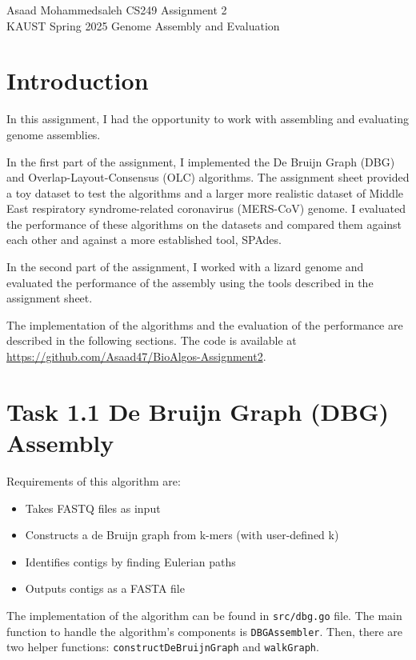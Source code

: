 \documentclass[12pt]{article}
\begin{document}
\noindent Asaad Mohammedsaleh \hfill CS249 Assignment 2\\
KAUST Spring 2025 \hfill Genome Assembly and Evaluation


\hrulefill

\section{Introduction}

In this assignment, I had the opportunity to work with assembling and evaluating genome assemblies. 

In the first part of the assignment, I implemented the De Bruijn Graph (DBG) and Overlap-Layout-Consensus (OLC) algorithms.
The assignment sheet provided a toy dataset to test the algorithms and a larger more realistic dataset of Middle East respiratory
syndrome-related coronavirus (MERS-CoV) genome. I evaluated the performance of these algorithms on the datasets and compared them against each other and against a more established tool, SPAdes.

In the second part of the assignment, I worked with a lizard genome and evaluated the performance of the assembly using the tools described in the assignment sheet. 

The implementation of the algorithms and the evaluation of the performance are described in the following sections. The code is available at \url{https://github.com/Asaad47/BioAlgos-Assignment2}.

\section{Task 1.1 De Bruijn Graph (DBG) Assembly}

Requirements of this algorithm are:
\begin{itemize}
    \item Takes FASTQ files as input
    \item Constructs a de Bruijn graph from k-mers (with user-defined k)
    \item Identifies contigs by finding Eulerian paths
    \item Outputs contigs as a FASTA file
\end{itemize}

The implementation of the algorithm can be found in \texttt{src/dbg.go} file. The main function to handle the algorithm's components is \texttt{DBGAssembler}.
Then, there are two helper functions: \texttt{constructDeBruijnGraph} and \texttt{walkGraph}.
\end{document}
